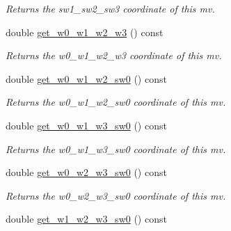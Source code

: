 \begin{DoxyCompactItemize}
\begin{DoxyCompactList}\small\item\em Returns the sw1\-\_\-sw2\-\_\-sw3 coordinate of this mv. \end{DoxyCompactList}\item 
\hypertarget{classe3ga_1_1mv_afd3ac9609a70f05c507176e42114b72e}{double \hyperlink{classe3ga_1_1mv_afd3ac9609a70f05c507176e42114b72e}{get\-\_\-w0\-\_\-w1\-\_\-w2\-\_\-w3} () const }\label{classe3ga_1_1mv_afd3ac9609a70f05c507176e42114b72e}

\begin{DoxyCompactList}\small\item\em Returns the w0\-\_\-w1\-\_\-w2\-\_\-w3 coordinate of this mv. \end{DoxyCompactList}\item 
\hypertarget{classe3ga_1_1mv_a8dfa8bfd31bc195977d205f6f2d6c4d9}{double \hyperlink{classe3ga_1_1mv_a8dfa8bfd31bc195977d205f6f2d6c4d9}{get\-\_\-w0\-\_\-w1\-\_\-w2\-\_\-sw0} () const }\label{classe3ga_1_1mv_a8dfa8bfd31bc195977d205f6f2d6c4d9}

\begin{DoxyCompactList}\small\item\em Returns the w0\-\_\-w1\-\_\-w2\-\_\-sw0 coordinate of this mv. \end{DoxyCompactList}\item 
\hypertarget{classe3ga_1_1mv_abcf3b0dabc80a1f197b4d31ba155cc93}{double \hyperlink{classe3ga_1_1mv_abcf3b0dabc80a1f197b4d31ba155cc93}{get\-\_\-w0\-\_\-w1\-\_\-w3\-\_\-sw0} () const }\label{classe3ga_1_1mv_abcf3b0dabc80a1f197b4d31ba155cc93}

\begin{DoxyCompactList}\small\item\em Returns the w0\-\_\-w1\-\_\-w3\-\_\-sw0 coordinate of this mv. \end{DoxyCompactList}\item 
\hypertarget{classe3ga_1_1mv_a02decd25458d47af816f9269e1c5d041}{double \hyperlink{classe3ga_1_1mv_a02decd25458d47af816f9269e1c5d041}{get\-\_\-w0\-\_\-w2\-\_\-w3\-\_\-sw0} () const }\label{classe3ga_1_1mv_a02decd25458d47af816f9269e1c5d041}

\begin{DoxyCompactList}\small\item\em Returns the w0\-\_\-w2\-\_\-w3\-\_\-sw0 coordinate of this mv. \end{DoxyCompactList}\item 
\hypertarget{classe3ga_1_1mv_a76346d23e65d7e841ea4bf72f2825f25}{double \hyperlink{classe3ga_1_1mv_a76346d23e65d7e841ea4bf72f2825f25}{get\-\_\-w1\-\_\-w2\-\_\-w3\-\_\-sw0} () const }\label{classe3ga_1_1mv_a76346d23e65d7e841ea4bf72f2825f25}


\end{DoxyCompactItemize}
